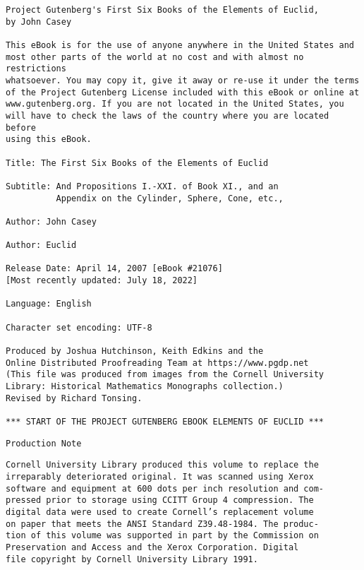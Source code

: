 \documentclass[oneside]{book}
\begin{document}
\pagestyle{empty}

\thispagestyle{empty}
\small
\begin{verbatim}
Project Gutenberg's First Six Books of the Elements of Euclid,
by John Casey

This eBook is for the use of anyone anywhere in the United States and
most other parts of the world at no cost and with almost no restrictions
whatsoever. You may copy it, give it away or re-use it under the terms
of the Project Gutenberg License included with this eBook or online at
www.gutenberg.org. If you are not located in the United States, you
will have to check the laws of the country where you are located before
using this eBook.

Title: The First Six Books of the Elements of Euclid

Subtitle: And Propositions I.-XXI. of Book XI., and an
          Appendix on the Cylinder, Sphere, Cone, etc.,

Author: John Casey

Author: Euclid

Release Date: April 14, 2007 [eBook #21076]
[Most recently updated: July 18, 2022]

Language: English

Character set encoding: UTF-8

Produced by Joshua Hutchinson, Keith Edkins and the
Online Distributed Proofreading Team at https://www.pgdp.net
(This file was produced from images from the Cornell University
Library: Historical Mathematics Monographs collection.)
Revised by Richard Tonsing.

*** START OF THE PROJECT GUTENBERG EBOOK ELEMENTS OF EUCLID ***
\end{verbatim}
\normalsize

\frontmatter
\pagestyle {empty}




\begin{center}
\texttt{Production Note}
\end{center}

\noindent
\texttt{Cornell University Library produced this volume to replace the \\
irreparably deteriorated original. It was scanned using Xerox \\
software and equipment at 600 dots per inch resolution and com- \\
pressed prior to storage using CCITT Group 4 compression. The \\
digital data were used to create Cornell's replacement volume \\
on paper that meets the ANSI Standard Z39.48-1984. The produc- \\
tion of this volume was supported in part by the Commission on \\
Preservation and Access and the Xerox Corporation. Digital \\
file copyright by Cornell University Library 1991.}
\end{document}

